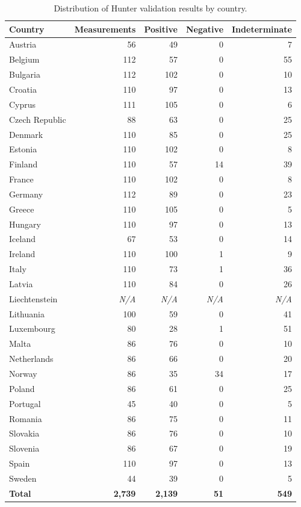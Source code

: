\begin{table}[ht]
    \centering
    \small
    \caption{Distribution of Hunter validation results by country.}
    \label{tab:hunter_validation_results_country}
    \begin{tabular}{lrrrr}
        \toprule
        \textbf{Country} & \textbf{Measurements} & \textbf{Positive} & \textbf{Negative} & \textbf{Indeterminate} \\
        \midrule
        Austria & 56 & 49 & 0 & 7 \\
        Belgium & 112 & 57 & 0 & 55 \\
        Bulgaria & 112 & 102 & 0 & 10 \\
        Croatia & 110 & 97 & 0 & 13 \\
        Cyprus & 111 & 105 & 0 & 6 \\
        Czech Republic & 88 & 63 & 0 & 25 \\
        Denmark & 110 & 85 & 0 & 25 \\
        Estonia & 110 & 102 & 0 & 8 \\
        Finland & 110 & 57 & 14 & 39 \\
        France & 110 & 102 & 0 & 8 \\
        Germany & 112 & 89 & 0 & 23 \\
        Greece & 110 & 105 & 0 & 5 \\
        Hungary & 110 & 97 & 0 & 13 \\
        Iceland & 67 & 53 & 0 & 14 \\
        Ireland & 110 & 100 & 1 & 9 \\
        Italy & 110 & 73 & 1 & 36 \\
        Latvia & 110 & 84 & 0 & 26 \\
        Liechtenstein & \textit{N/A} & \textit{N/A} & \textit{N/A} & \textit{N/A} \\
        Lithuania & 100 & 59 & 0 & 41 \\
        Luxembourg & 80 & 28 & 1 & 51 \\
        Malta & 86 & 76 & 0 & 10 \\
        Netherlands & 86 & 66 & 0 & 20 \\
        Norway & 86 & 35 & 34 & 17 \\
        Poland & 86 & 61 & 0 & 25 \\
        Portugal & 45 & 40 & 0 & 5 \\
        Romania & 86 & 75 & 0 & 11 \\
        Slovakia & 86 & 76 & 0 & 10 \\
        Slovenia & 86 & 67 & 0 & 19 \\
        Spain & 110 & 97 & 0 & 13 \\
        Sweden & 44 & 39 & 0 & 5 \\
        \midrule
        \textbf{Total} & \textbf{2,739} & \textbf{2,139} & \textbf{51} & \textbf{549} \\
        \bottomrule
    \end{tabular}
\end{table}


